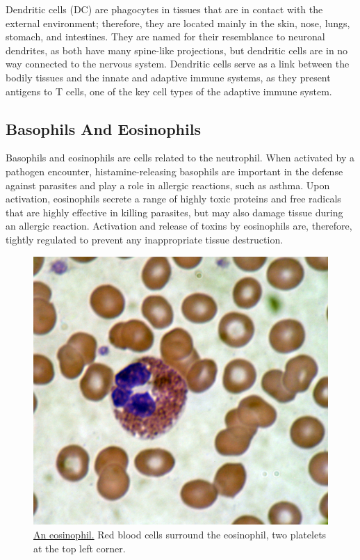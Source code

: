 Dendritic cells (DC) are phagocytes in tissues that are in contact with the external environment; therefore, they are located mainly in the skin, nose, lungs, stomach, and intestines. They are named for their resemblance to neuronal dendrites, as both have many spine-like projections, but dendritic cells are in no way connected to the nervous system. Dendritic cells serve as a link between the bodily tissues and the innate and adaptive immune systems, as they present antigens to T cells, one of the key cell types of the adaptive immune system.

\hypertarget{basophils-and-eosinophils}{%
\subsection{Basophils And Eosinophils}\label{basophils-and-eosinophils}}

Basophils and eosinophils are cells related to the neutrophil. When activated by a pathogen encounter, histamine-releasing basophils are important in the defense against parasites and play a role in allergic reactions, such as asthma. Upon activation, eosinophils secrete a range of highly toxic proteins and free radicals that are highly effective in killing parasites, but may also damage tissue during an allergic reaction. Activation and release of toxins by eosinophils are, therefore, tightly regulated to prevent any inappropriate tissue destruction.



\begin{figure}

{\centering \includegraphics[width=0.7\linewidth]{./figures/immune/Eosinophil_blood_smear} 

}

\caption{\href{https://commons.wikimedia.org/wiki/File:Eosinophil_blood_smear.JPG}{An eosinophil.} Red blood cells surround the eosinophil, two platelets at the top left corner.}\label{fig:eosinophil}
\end{figure}

